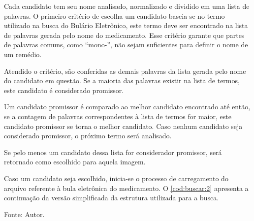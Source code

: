 Cada candidato tem seu nome analisado, normalizado e dividido em uma lista de palavras.
O primeiro critério de escolha um candidato baseia-se no termo utilizado na busca do Bulário Eletrônico, este termo deve ser encontrado na lista de palavras gerada pelo nome do medicamento.
Esse critério garante que partes de palavras comuns, como ``mono-'', não sejam suficientes para definir o nome de um remédio.

Atendido o critério, são conferidas as demais palavras da lista gerada pelo nome do candidato em questão.
Se a maioria das palavras existir na lista de termos, este candidato é considerado promissor.

Um candidato promissor é comparado ao melhor candidato encontrado até então, se a contagem de palavras correspondentes à lista de termos for maior, este candidato promissor se torna o melhor candidato.
Caso nenhum candidato seja considerado promissor, o próximo termo será analisado.

Se pelo menos um candidato dessa lista for considerador promissor, será retornado como escolhido para aquela imagem.

Caso um candidato seja escolhido, inicia-se o processo de carregamento do arquivo referente à bula eletrônica do medicamento.
O \autoref{cod:buscar:2} apresenta a continuação da versão simplificada da estrutura utilizada para a busca.

\begin{lstfloat}[htbp]
    \centering
    
    \caption*{Fonte: Autor.}
\end{lstfloat}








